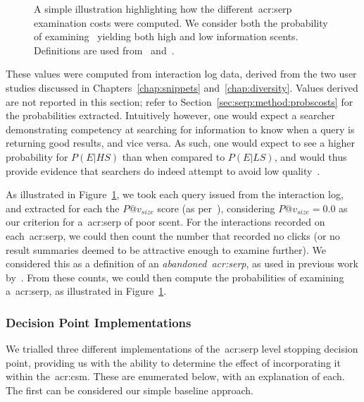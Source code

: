\begin{figure}[t!]
    \centering
    \caption[Computing~\gls{acr:serp} examination probabilities]{A simple illustration highlighting how the different~\gls{acr:serp} examination costs were computed. We consider both the probability of examining~ yielding both high and low information scents. Definitions are used from~\cite{wu2014information_scent} and~\cite{hassan2013serp_abandonment}.}
    \label{fig:serp_probabilities}
\end{figure}

These values were computed from interaction log data, derived from the two user studies discussed in Chapters~\ref{chap:snippets} and~\ref{chap:diversity}. Values derived are not reported in this section; refer to Section~\ref{sec:serp:method:probscosts} for the probabilities extracted. Intuitively however, one would expect a searcher demonstrating competency at searching for information to know when a query is returning good results, and vice versa. As such, one would expect to see a higher probability for $P(E|HS)$ than when compared to $P(E|LS)$, and would thus provide evidence that searchers do indeed attempt to avoid low quality~.

As illustrated in Figure~\ref{fig:serp_probabilities}, we took each query issued from the interaction log, and extracted for each the $P@v_{size}$ score (as per~\cite{wu2014information_scent}), considering $P@v_{size}=0.0$ as our criterion for a~\gls{acr:serp} of poor scent. For the interactions recorded on each~\gls{acr:serp}, we could then count the number that recorded no clicks (or no result summaries deemed to be attractive enough to examine further). We considered this as a definition of an \emph{abandoned~\gls{acr:serp}}, as used in previous work by~\cite{hassan2013serp_abandonment}. From these counts, we could then compute the probabilities of examining a~\gls{acr:serp}, as illustrated in Figure~\ref{fig:serp_probabilities}.

\subsubsection{Decision Point Implementations}\label{sec:serp:method:serp_dp:implementations}
We trialled three different implementations of the~\gls{acr:serp} level stopping decision point, providing us with the ability to determine the effect of incorporating it within the~\gls{acr:csm}. These are enumerated below, with an explanation of each. The first can be considered our simple baseline approach.

